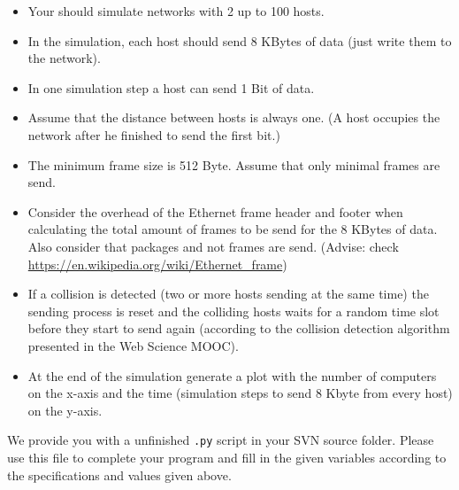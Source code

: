 \documentclass{WeSTassignment}
\begin{document}
\begin{itemize}
  \item Your should simulate networks with 2 up to 100 hosts.
  \item In the simulation, each host should send 8 KBytes of data (just write
    them to the network).
  \item In one simulation step a host can send 1 Bit of data.
  \item Assume that the distance between hosts is always one. (A host occupies
    the network after he finished to send the first bit.)
  \item The minimum frame size is 512 Byte. Assume that only minimal frames are
    send.
  \item Consider the overhead of the Ethernet frame header and footer when
    calculating the total amount of frames to be send for the 8 KBytes of data.
    Also consider that packages and not frames are send. (Advise: check
    \url{https://en.wikipedia.org/wiki/Ethernet_frame})
  \item If a collision is detected (two or more hosts sending at the same time)
    the sending process is reset and the colliding hosts waits for a random time
    slot before they start to send again (according to the collision detection
    algorithm presented in the Web Science MOOC).
  \item At the end of the simulation generate a plot with the number of
    computers on the x-axis and the time (simulation steps to send 8 Kbyte from
    every host) on the y-axis.
\end{itemize}

We provide you with a unfinished \texttt{.py} script in your SVN source folder.
Please use this file to complete your program and fill in the given variables
according to the specifications and values given above.

\makefooter
\end{document}
